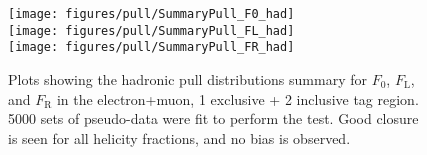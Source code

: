   \begin{figure}[!hb]    
      \begin{center}         
        \texttt{[image: figures/pull/SummaryPull\_F0\_had]}\\
        \texttt{[image: figures/pull/SummaryPull\_FL\_had]}\\
        \texttt{[image: figures/pull/SummaryPull\_FR\_had]}\\
        \caption{Plots showing the hadronic pull distributions summary for $F_{\text{0}}$, $F_{\text{L}}$, and $F_{\text{R}}$ in the electron+muon, 1 exclusive + 2 inclusive \bt tag region. 5000 sets of pseudo-data were fit to perform the test. Good closure is seen for all helicity fractions, and no bias is observed.}
  \label{fig:pull_hadronic}
  \end{center}
  \end{figure}



